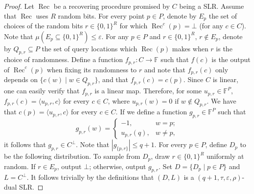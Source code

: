 \begin{proof}
Let $\operatorname{Rec}$ be a recovering procedure promised by $C$ being a SLR. Assume that $\operatorname{Rec}$ uses $R$ random bits. For every point $p\in P$, denote by $E_p$ the set of choices of the random bits $r\in\{0,1\}^R$ for which $\operatorname{Rec}^c(p)=\bot$ (for any $c\in C$). Note that $\mu(E_p\subseteq\{0,1\}^R)\leq\varepsilon$.
For any $p\in P$ and $r\in\{0,1\}^R$, $r\notin E_p$, denote by $Q_{p,r}\subseteq P$ the set of query locations which $\operatorname{Rec}(p)$ makes when $r$ is the choice of randomness. Define a function $f_{p,r}:C\to\mathbb F$ such that $f(c)$ is the output of $\operatorname{Rec}^c(p)$ when fixing its randomness to $r$ and note that $f_{p,r}(c)$ only depends on $\{c(w)\mid w\in Q_{p,r}\}$, and that $f_{p,r}(c)=c(p)$. Since $C$ is linear, one can easily verify that $f_{p,r}$ is a linear map. Therefore, for some $u_{p,r}\in\mathbb F^P$, $f_{p,r}(c)=\langle u_{p,r},c\rangle$ for every $c\in C$, where $u_{p,r}(w)=0$ if $w\notin Q_{p,r}$. We have that $c(p)=\langle u_{p,r},c\rangle$ for every $c\in C$. If we define a function $g_{p,r}\in\mathbb F^P$ such that
\[g_{p,r}(w)=\begin{cases}-1,&w=p;\\u_{p,r}(q),&w\ne p,\end{cases}\]
it follows that $g_{p,r}\in C^\perp$. Note that $|g_{\{p,r\}}|\leq q+1$.
For every $p\in P$, define $D_p$ to be the following distribution. To sample from $D_p$, draw $r\in\{0,1\}^R$ uniformly at random. If $r\in E_p$, output $\bot$; otherwise, output $g_{p,r}$. Set $D=\{D_p\mid p\in P\}$ and $L=C^\perp$. It follows trivially by the definitions that $(D,L)$ is a $(q+1,\tau,\varepsilon,\rho)$-dual SLR.
\end{proof}

